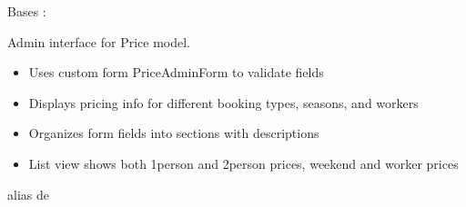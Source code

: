 \documentclass[letterpaper,10pt,french]{sphinxmanual}
\begin{document}

\begin{fulllineitems}
\label{\detokenize{index:bookings.admin.PriceAdmin}}
\pysigstartsignatures
\pysiglinewithargsret
{}
{\sphinxparamcomma {}}
{}
\pysigstopsignatures
\sphinxAtStartPar
Bases : 

\sphinxAtStartPar
Admin interface for Price model.
\begin{itemize}
\item {} 
\sphinxAtStartPar
Uses custom form PriceAdminForm to validate fields

\item {} 
\sphinxAtStartPar
Displays pricing info for different booking types, seasons, and workers

\item {} 
\sphinxAtStartPar
Organizes form fields into sections with descriptions

\item {} 
\sphinxAtStartPar
List view shows both 1\sphinxhyphen{}person and 2\sphinxhyphen{}person prices, weekend and worker prices

\end{itemize}

\begin{fulllineitems}
\label{\detokenize{index:bookings.admin.PriceAdmin.form}}
\pysigstartsignatures
\pysigline
{}
\pysigstopsignatures
\sphinxAtStartPar
alias de {\hyperref[\detokenize{index:bookings.admin.PriceAdminForm}]{}}

\end{fulllineitems}



\end{fulllineitems}
\end{document}
